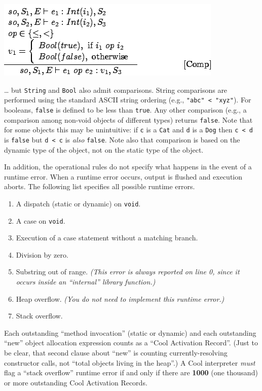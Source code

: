 \documentclass[]{article}
\begin{document}
\includegraphics{img181.png}

\ldots{} but \texttt{String} and \texttt{Bool} also admit comparisons.
String comparisons are performed using the standard ASCII string
ordering (e.g., \texttt{"abc" \textless{} "xyz"}). For booleans,
\texttt{false} is defined to be less than \texttt{true}. Any other
comparison (e.g., a comparison among non-void objects of different
types) returns \texttt{false}. Note that for some objects this may be
unintuitive: if \texttt{c} is a \texttt{Cat} and \texttt{d} is a
\texttt{Dog} then \texttt{c \textless{} d} is \texttt{false} but
\texttt{d \textless{} c} is \emph{also} \texttt{false}. Note also that
comparison is based on the dynamic type of the object, not on the static
type of the object.

In addition, the operational rules do not specify what happens in the
event of a runtime error. When a runtime error occurs, output is flushed
and execution aborts. The following list specifies all possible runtime
errors.

\begin{enumerate}
\itemsep1pt\parskip0pt
\item
  A dispatch (static or dynamic) on \texttt{void}.
\item
  A case on \texttt{void}.
\item
  Execution of a case statement without a matching branch.
\item
  Division by zero.
\item
  Substring out of range. \emph{(This error is always reported on line
  0, since it occurs inside an ``internal'' library function.)}
\item
  Heap overflow. \emph{(You do not need to implement this runtime
  error.)}
\item
  Stack overflow.
\end{enumerate}

Each outstanding ``method invocation'' (static or dynamic) and each
outstanding ``new'' object allocation expression counts as a ``Cool
Activation Record''. (Just to be clear, that second clause about ``new''
is counting currently-resolving constructor calls, not ``total objects
living in the heap''.) A Cool interpreter \emph{must} flag a ``stack
overflow'' runtime error if and only if there are \textbf{1000} (one
thousand) or more outstanding Cool Activation Records.
\end{document}
